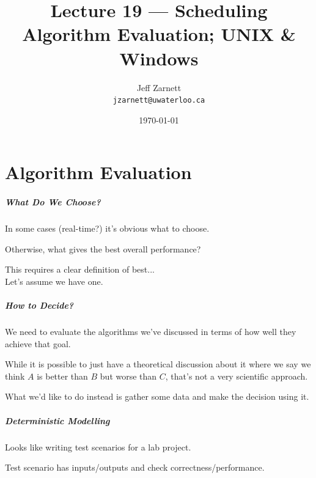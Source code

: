 

\title{Lecture 19 --- Scheduling Algorithm Evaluation; UNIX \& Windows}

\author{Jeff Zarnett \\ \small \texttt{jzarnett@uwaterloo.ca}}
\date{\today}




\begin{frame}
  \titlepage

 \end{frame}
 
\part{Algorithm Evaluation}

\begin{frame}
\partpage
\end{frame}
 
\begin{frame}
\frametitle{What Do We Choose?}

In some cases (real-time?) it's obvious what to choose.

Otherwise, what gives the best overall performance?

This requires a clear definition of best...\\
\quad Let's assume we have one.

\end{frame}

\begin{frame}
\frametitle{How to Decide?}

We need to evaluate the algorithms we've discussed in terms of how well they achieve that goal. 

While it is possible to just have a theoretical discussion about it where we say we think $A$ is better than $B$ but worse than $C$, that's not a very scientific approach. 

What we'd like to do instead is gather some data and make the decision using it.

\end{frame}

\begin{frame}
\frametitle{Deterministic Modelling}

Looks like writing test scenarios for a lab project.

Test scenario has inputs/outputs and check correctness/performance.

\end{frame}

